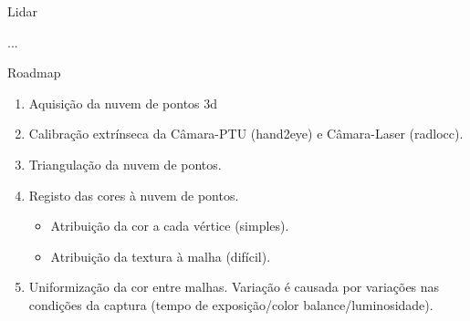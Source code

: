 \begin{frame}{Lidar}
	
	...
																
\end{frame}

\begin{frame}{Roadmap}
	    
	\begin{enumerate}
		        
		\item Aquisição da nuvem de pontos 3d
		      
		\item Calibração extrínseca da Câmara-PTU (hand2eye) e Câmara-Laser (radlocc).
		      
		\item Triangulação da nuvem de pontos.
		              
		\item Registo das cores à nuvem de pontos.
		      \begin{itemize}
		      	\item Atribuição da cor a cada vértice (simples).
		      	\item Atribuição da textura à malha (difícil).
		      \end{itemize}
              
        \item Uniformização da cor entre malhas. Variação é causada por variações nas condições da captura (tempo de exposição/color balance/luminosidade).

	\end{enumerate}
	
\end{frame}